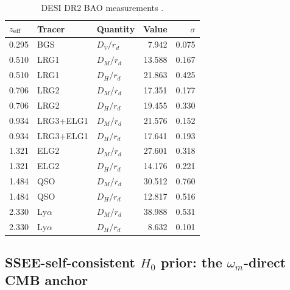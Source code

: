 \documentclass[12pt,a4paper]{article}
\begin{document}
\begin{table}[H]
\centering
\caption{DESI DR2 BAO measurements \citep{DESI_DR2}.}
\label{tab:bao_data}
\small
\begin{tabular}{lllrr}
\toprule
$z_{\rm eff}$ & Tracer & Quantity & Value & $\sigma$ \\
\midrule
0.295 & BGS         & $D_V/r_d$  &  7.942 & 0.075 \\
0.510 & LRG1        & $D_M/r_d$  & 13.588 & 0.167 \\
0.510 & LRG1        & $D_H/r_d$  & 21.863 & 0.425 \\
0.706 & LRG2        & $D_M/r_d$  & 17.351 & 0.177 \\
0.706 & LRG2        & $D_H/r_d$  & 19.455 & 0.330 \\
0.934 & LRG3+ELG1   & $D_M/r_d$  & 21.576 & 0.152 \\
0.934 & LRG3+ELG1   & $D_H/r_d$  & 17.641 & 0.193 \\
1.321 & ELG2        & $D_M/r_d$  & 27.601 & 0.318 \\
1.321 & ELG2        & $D_H/r_d$  & 14.176 & 0.221 \\
1.484 & QSO         & $D_M/r_d$  & 30.512 & 0.760 \\
1.484 & QSO         & $D_H/r_d$  & 12.817 & 0.516 \\
2.330 & Ly$\alpha$  & $D_M/r_d$  & 38.988 & 0.531 \\
2.330 & Ly$\alpha$  & $D_H/r_d$  &  8.632 & 0.101 \\
\bottomrule
\end{tabular}
\end{table}

\subsection{SSEE-self-consistent $H_0$ prior: the $\omega_m$-direct CMB anchor}
\label{sec:prior_mira}
\end{document}
